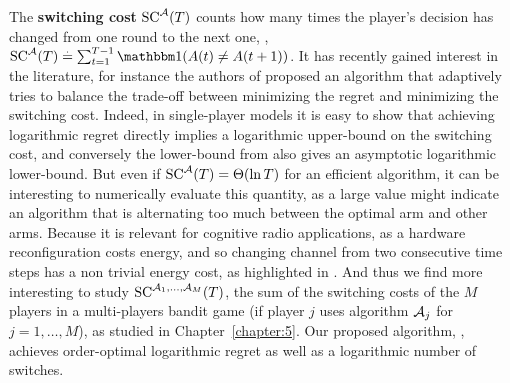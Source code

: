 The \textbf{switching cost} $\mathrm{SC}^{\mathcal{A}}(T)$ counts how many times the player's decision has changed from one round to the next one, \ie, $\mathrm{SC}^{\cA}(T) \eqdef \sum_{t=1}^{T-1} \indic(A(t) \neq A(t+1))$.
It has recently gained interest in the literature, for instance the authors of \cite{Koren17} proposed an algorithm that adaptively tries to balance the trade-off between minimizing the regret and minimizing the switching cost.
%
Indeed, in single-player models it is easy to show that achieving logarithmic regret directly implies a logarithmic upper-bound on the switching cost, and conversely the lower-bound from \cite{LaiRobbins85} also gives an asymptotic logarithmic lower-bound.
But even if $\mathrm{SC}^{\mathcal{A}}(T) = \Theta(\ln T)$ for an efficient algorithm, it can be interesting to numerically evaluate this quantity, as a large value might indicate an algorithm that is alternating too much between the optimal arm and other arms.
%
Because it is relevant for cognitive radio applications, as a hardware reconfiguration costs energy, and so changing channel from two consecutive time steps has a non trivial energy cost, as highlighted in \cite{modiDemo2016}.
And thus we find more interesting to study $\mathrm{SC}^{\mathcal{A}_1,\dots,\mathcal{A}_M}(T)$, the sum of the switching costs of the $M$ players in a multi-players bandit game (if player $j$ uses algorithm $\mathcal{A}_j$ for $j=1,\dots,M$), as studied in Chapter~\ref{chapter:5}.
Our proposed algorithm, \MCTopM, achieves order-optimal logarithmic regret as well as a logarithmic number of switches.


